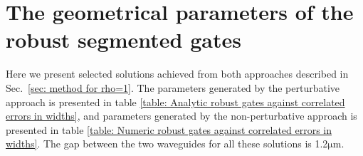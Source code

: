 \documentclass[floatfix,reprint, amsmath,amssymb,aps,superscriptaddress,nofootinbib]{revtex4-2}
\begin{document}
\newpage
\section{The geometrical parameters of the robust segmented gates \label{appendix: gate_parameters}}
Here we present selected solutions achieved from both approaches described in Sec.~\ref{sec: method for rho=1}. The parameters generated by the perturbative approach is presented in table \ref{table: Analytic robust gates against correlated errors in widths}, and parameters generated by the non-perturbative approach is presented in table \ref{table: Numeric robust gates against correlated errors in widths}. The gap between the two waveguides for all these solutions is 1.2$\mathrm{\mu m}$.

\newpage

\begin{table}[tb]
\centering
{}
      \caption{Selected robust segmented gates achieved by the perturbative approach. These gates are robust against correlated errors in the widths.}
  \label{table: Analytic robust gates against correlated errors in widths}
\end{table}
\end{document}
